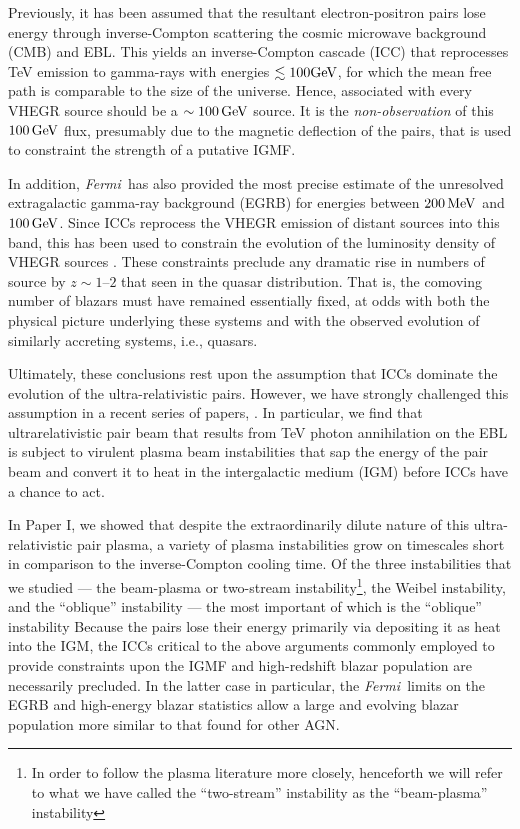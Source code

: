 \documentclass[usenatbib,iop,apj,numberedappendix]{aeb_emulateapj_2010}
\def\eV{{\rm eV}} %
\def\MeV{{\rm M}\eV} %
\def\GeV{{\rm G}\eV} %
\def\Fermi{{\em Fermi\ }}
\begin{document}
Previously, it has been  assumed that the resultant electron-positron pairs lose energy through inverse-Compton scattering the cosmic microwave background (CMB) and EBL. This yields an inverse-Compton cascade (ICC) that reprocesses TeV emission to gamma-rays with energies $\lesssim 100 \GeV$, for which the mean free path is comparable to the size of the universe.    
Hence, associated with every VHEGR source should be a $\sim 100\,\GeV$ source.  It is the {\it non-observation} of this $100\,\GeV$ flux, presumably due to the magnetic deflection of the pairs, that is used to constraint the strength of a putative IGMF.

In addition, \Fermi has also provided the most precise estimate of the unresolved
extragalactic gamma-ray background (EGRB) for energies between
$200\,\MeV$ and $100\,\GeV$.  Since ICCs reprocess the VHEGR emission of
distant sources into this band, this has been used to constrain the
evolution of the luminosity density of VHEGR sources
\citep[see, e.g., ][]{Naru-Tota:06,Knei-Mann:08,Inou-Tota:09,Vent:10}.
These constraints preclude any dramatic rise in numbers of source by $z\sim1$--$2$ that seen in the quasar
distribution.  That is, the comoving number of blazars must have
remained essentially fixed, at odds with both the physical picture
underlying these systems and with the observed evolution of similarly
accreting systems, i.e., quasars.

Ultimately, these conclusions rest upon the assumption that ICCs dominate the evolution of the ultra-relativistic pairs.  
However, we have strongly challenged this assumption in a recent series of papers, \citet[][hereafter paper I, II, and III respectively]{BCP,CBP, PCB}.  In particular, we find that ultrarelativistic pair beam that results from TeV photon annihilation on the EBL is subject to virulent plasma beam instabilities that sap the energy of the pair beam and convert it to heat in the intergalactic medium (IGM) before ICCs have a chance to act.

In Paper I, we showed that despite the extraordinarily dilute nature of this ultra-relativistic pair plasma, a variety of plasma instabilities grow on timescales short in comparison to the inverse-Compton cooling time. Of the three instabilities that we studied --- the beam-plasma or two-stream instability\footnote{In order to follow the plasma literature more closely, henceforth we will refer to what we have called the ``two-stream'' instability as the ``beam-plasma'' instability}, the Weibel instability, and the ``oblique'' instability  ---  the most
important of which is the ``oblique'' instability \citep{Bret-Firp-Deut:04}
Because the pairs lose their energy primarily via depositing it as heat into the IGM, the ICCs critical to the above arguments commonly employed to provide constraints upon the IGMF and high-redshift blazar population are necessarily precluded.  In the latter case in particular, the \Fermi limits on the EGRB and high-energy blazar statistics allow a large and evolving blazar population more similar to that found for other AGN.
\end{document}
